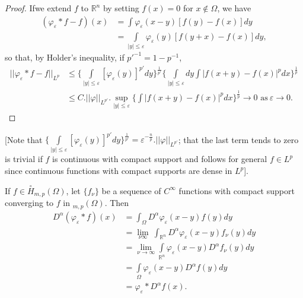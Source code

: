 \begin{proof}
  If\pageoriginale we extend $f$ to $\mathbb{R}^n$ by setting $f(x) = 0$ for $x
  \notin \Omega$, we have  
  \begin{align*}
    (\varphi_\varepsilon * f - f) (x) & = \int \varphi_\varepsilon
    (x-y ) [f (y) - f(x) ] dy\\ 
    & = \int\limits_{| y | \le \varepsilon} \varphi_ \varepsilon (y) [
      f(y+x) - f(x) ] dy, 
  \end{align*}
  so that, by Holder's inequality, if $p'^{-1} = 1 -  p^{-1}$,
{\fontsize{10}{12}\selectfont
  \begin{align*}
    || \varphi_ \varepsilon * f - f ||_{L^p} & \le \big \{
    \int\limits_{| y | \le \varepsilon} [ \varphi_ \varepsilon (y)
    ]^{p'} dy \big \}^{\frac{1}{p'}} \big \{\int\limits_{| y | \le
      \varepsilon}  dy \int | f (x+y) - f(x) |^p dx \big
    \}^{\frac{1}{p}}\\ 
    & \le C. || \varphi ||_{L^{p'}} . \sup\limits_{| y | \le
      \varepsilon} \big\{\int | f(x+y) - f(x) |^p dx \big \}^{\frac{1}{p}}
    \to 0 \text { as}~  \varepsilon \to 0.  
  \end{align*}}
\end{proof}

[Note that $\big\{ \int\limits_{| y | \le \varepsilon} [\varphi_
    \varepsilon (y) ]^{p'} dy \big \}^{\frac{1}{p'}} = \varepsilon ^{-
    \frac{n}{p}}. || \varphi ||_{L^{p'}}$; that the last term tends to
  zero is trivial if $f$ is continuous with compact support and
  follows for general $f \in L^p$ since continuous functions with
  compact  supports are dense in $L^p$]. 

If $f \in \overset{\circ}{H}_{m, p}  (\Omega) $, let $\{f_\nu\}$ be a
sequence of $C^\infty$ functions with compact support converging to
$f$ in $_{m, p} (\Omega)$. Then  
\begin{align*}
  D^\alpha (\varphi_ \varepsilon * f) (x) & = \int_{\Omega}
  D^\alpha \varphi_ \varepsilon (x- y) f(y) dy\\ 
  & = \lim_{\nu \infty} ~ \int_{\mathbb{R}^n} D^\alpha \varphi_
  \varepsilon (x- y) f_\nu (y) dy\\ 
  & = \lim_{\nu \to \infty} \int\limits_{\mathbb{R}^n} \varphi_
  \varepsilon (x- y) D^\alpha f_\nu (y) dy\\ 
  & = \int\limits_{\Omega} \varphi_ \varepsilon (x- y) D^\alpha f(y) dy\\
  & = \varphi_ \varepsilon * D^\alpha f (x).
\end{align*}

